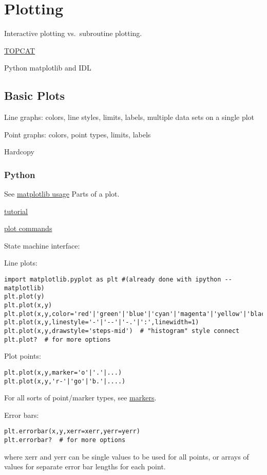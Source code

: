 \documentclass{article}
\begin{document}
\newpage
\section{Plotting}
Interactive plotting vs.\ subroutine plotting.

\href{http://www.star.bris.ac.uk/~mbt/topcat/}{TOPCAT}

Python matplotlib and IDL

\subsection{Basic Plots}
Line graphs: colors, line styles, limits, labels, multiple data sets
on a single plot

Point graphs: colors, point types, limits, labels

Hardcopy


\subsubsection{Python}
See \href{http://matplotlib.org/faq/usage_faq.html}{matplotlib usage}
Parts of a plot.

\href{http://matplotlib.org/users/pyplot_tutorial.html}
{tutorial}

\href{http://matplotlib.org/api/pyplot_summary.html}
{plot commands}

State machine interface:

Line plots:

\begin{verbatim}
import matplotlib.pyplot as plt #(already done with ipython --matplotlib)
plt.plot(y)
plt.plot(x,y)
plt.plot(x,y,color='red'|'green'|'blue'|'cyan'|'magenta'|'yellow'|'black'|....)
plt.plot(x,y,linestyle='-'|'--'|'-.'|':',linewidth=1)
plt.plot(x,y,drawstyle='steps-mid')  # "histogram" style connect
plt.plot?  # for more options
\end{verbatim}

Plot points:
\begin{verbatim}
plt.plot(x,y,marker='o'|'.'|...)
plt.plot(x,y,'r-'|'go'|'b.'|....)
\end{verbatim}

For all sorts of point/marker types, see
\href{http://matplotlib.org/api/markers_api.html}
{markers}.

Error bars:
\begin{verbatim}
plt.errorbar(x,y,xerr=xerr,yerr=yerr)
plt.errorbar?  # for more options
\end{verbatim}
where xerr and yerr can be single values to be used for all points, or
arrays of values for separate error bar lengths for each point.
\end{document}
